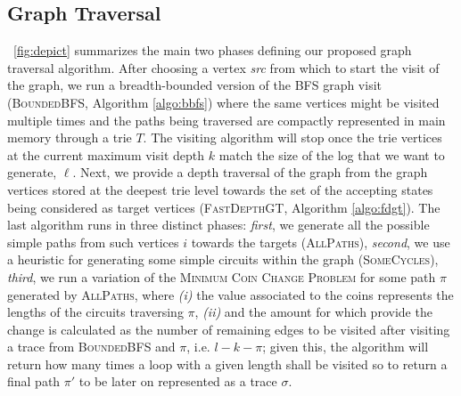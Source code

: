 \documentclass[sigconf]{acmart}
\begin{document}
\subsection{Graph Traversal}\label{sec:gtrav}
\figurename~\ref{fig:depict} summarizes the main two phases defining our proposed graph traversal algorithm. After choosing a vertex \textit{src} from which to start the visit of the graph, we run a breadth-bounded version of the BFS graph visit (\textsc{BoundedBFS}, Algorithm \ref{algo:bbfs}) where the same vertices might be visited multiple times and the paths being traversed are compactly represented in main memory through a trie $T$. The visiting algorithm will stop once the trie vertices at the current maximum visit depth $k$ match the size of the log that we want to generate, $\ell$.  Next, we provide a depth traversal of the graph from the graph vertices stored at the deepest trie level towards the set of the accepting states being considered as target vertices (\textsc{FastDepthGT}, Algorithm \ref{algo:fdgt}). The last algorithm runs in  three distinct phases: \textit{first}, we generate all the possible simple paths from such vertices $i$ towards the targets (\textsc{AllPaths}), \textit{second}, we use a heuristic for generating some simple circuits within the graph (\textsc{SomeCycles}), \textit{third}, we run a variation of the \textsc{Minimum Coin Change Problem} for some path $\pi$ generated by \textsc{AllPaths}, where \textit{(i)} the value associated to the coins represents the lengths of the circuits traversing $\pi$, \textit{(ii)} and the amount for which provide  the change is calculated as the number of remaining edges to be visited after visiting a trace from \textsc{BoundedBFS} and $\pi$, i.e. $l-k-\pi$; given this, the algorithm will return how many times a loop with a given length shall be visited so to return a final path $\pi'$ to be later on represented as a trace $\sigma$.
\end{document}

